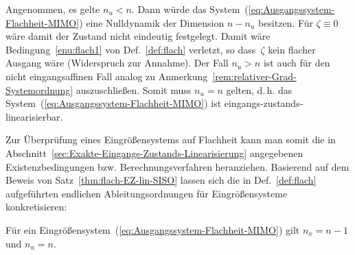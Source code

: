 \begin{svmultproof2}
Angenommen, es gelte $n_{u}<n$. Dann würde das System~(\ref{eq:Ausgangssystem-Flachheit-MIMO})
eine Nulldynamik der Dimension $n-n_{u}$ besitzen. Für $\zeta\equiv0$
wäre damit der Zustand nicht eindeutig festgelegt. Damit wäre Bedingung~\ref{enu:flach1}
von Def.~\ref{def:flach} verletzt, so dass~$\zeta$ kein flacher
Ausgang wäre (Widerspruch zur Annahme). Der Fall $n_{u}>n$ ist auch
für den nicht eingangsaffinen Fall analog zu Anmerkung~\ref{rem:relativer-Grad-Systemordnung}
auszuschließen. Somit muss $n_{u}=n$ gelten, d.\,h. das System~(\ref{eq:Ausgangssystem-Flachheit-MIMO})
ist eingangs-zustands-linearisierbar.
\end{svmultproof2}

Zur Überprüfung eines Eingrößensystems auf Flachheit kann man somit
die in Abschnitt~\ref{sec:Exakte-Eingangs-Zustands-Linearisierung}
angegebenen Existenzbedingungen bzw. Berechnungsverfahren heranziehen.
Basierend auf dem Beweis von Satz~\ref{thm:flach-EZ-lin-SISO} lassen
sich die in Def.~\ref{def:flach} aufgeführten endlichen Ableitungsordnungen
für Eingrößensysteme konkretisieren:
\begin{corollary}
Für ein Eingrößensystem~(\ref{eq:Ausgangssystem-Flachheit-MIMO})
gilt $n_{x}=n-1$ und $n_{u}=n$.
\end{corollary}

